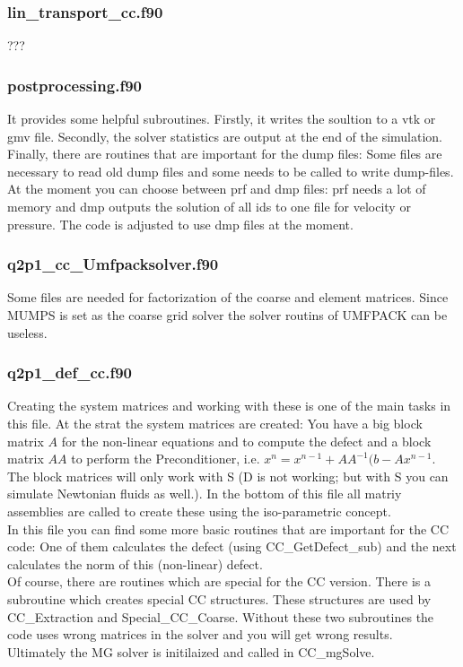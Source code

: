 \subsubsection*{lin\_transport\_cc.f90} 
???

\subsubsection*{postprocessing.f90} 
It provides some helpful subroutines. Firstly, it writes the soultion to a vtk or gmv file. Secondly, the solver statistics are output at the end of the simulation. Finally, there are routines that are important for the dump files: Some files are necessary to read old dump files and some needs to be called to write dump-files. At the moment you can choose between prf and dmp files: prf needs a lot of memory and dmp outputs the solution of all ids to one file for velocity or pressure. The code is adjusted to use dmp files at the moment.

\subsubsection*{q2p1\_cc\_Umfpacksolver.f90} 
Some files are needed for factorization of the coarse and element matrices. Since MUMPS is set as the coarse grid solver the solver routins of UMFPACK can be useless.

\subsubsection*{q2p1\_def\_cc.f90} 
Creating the system matrices and working with these is one of the main tasks in this file. At the strat the system matrices are created: You have a big block matrix $A$ for the non-linear equations and to compute the defect and a block matrix $AA$ to perform the Preconditioner, i.e. $x^n = x^{n-1} + AA^{-1}(b-A x^{n-1}$. The block matrices will only work with S (D is not working; but with S you can simulate Newtonian fluids as well.). In the bottom of this file all matriy assemblies are called to create these using the iso-parametric concept.\\
In this file you can find some more basic routines that are important for the CC code: One of them calculates the defect (using CC\_GetDefect\_sub) and the next calculates the norm of this (non-linear) defect. \\
Of course, there are routines which are special for the CC version. There is a subroutine which creates special CC structures. These structures are used by CC\_Extraction and Special\_CC\_Coarse. Without these two subroutines the code uses wrong matrices in the solver and you will get wrong results.\\ 
Ultimately the MG solver is initilaized and called in CC\_mgSolve.

